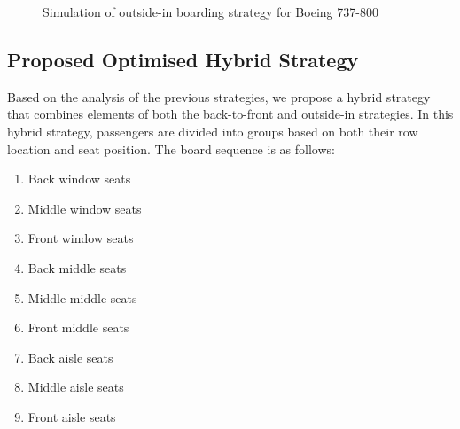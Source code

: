\documentclass[12pt]{article}
\begin{document}
\begin{figure}[H]
\centering
{}
\caption{Simulation of outside-in boarding strategy for Boeing 737-800}
\end{figure}

\subsection{Proposed Optimised Hybrid Strategy}

Based on the analysis of the previous strategies, we propose a hybrid strategy that combines elements of both the back-to-front and outside-in strategies. In this hybrid strategy, passengers are divided into groups based on both their row location and seat position. The board sequence is as follows:

\begin{enumerate}
    \item Back window seats
    \item Middle window seats
    \item Front window seats
    \item Back middle seats
    \item Middle middle seats
    \item Front middle seats
    \item Back aisle seats
    \item Middle aisle seats
    \item Front aisle seats
\end{enumerate}
\end{document}
